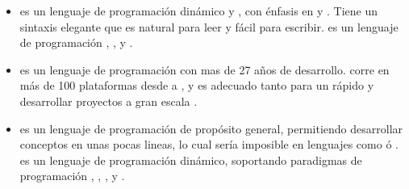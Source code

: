 \begin{itemize}
		\item \textbf{\rubyNAME} es un lenguaje de programación dinámico y \openSourcePC, con énfasis en \simplicity y \productivity. Tiene un sintaxis elegante que es natural para leer y fácil para escribir. \rubyNAME es un lenguaje de programación \objectOrientedPL, \imperativePL, y \functionalPL \cite{online_ruby_org}.

		\item \textbf{\perlNAME} es un lenguaje de programación con mas de 27 años de desarrollo.  corre en más de 100 plataformas desde \portablesAS a \mainframesAS, y es adecuado tanto para un rápido \prototypingCPT y desarrollar proyectos a gran escala \cite{online_org_perl_about}.

		\item \textbf{\pythonNAME} es un lenguaje de programación \highLevelCPT de propósito general, permitiendo desarrollar conceptos en unas pocas lineas, lo cual sería imposible en lenguajes como \javaNAME ó \cPlusPlus. \pythonNAME es un lenguaje de programación \multiParadigmPL dinámico, soportando paradigmas de programación \objectOrientedPL, \imperativePL, \functionalPL, \proceduralPL y  \cite{online_org_docs_python_functional}.
	\end{itemize}

